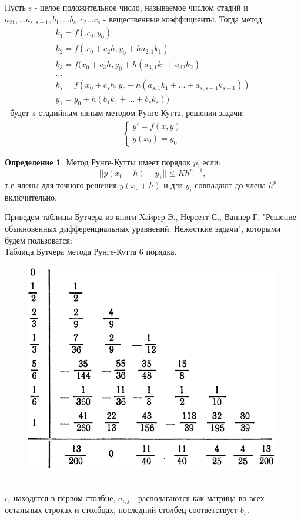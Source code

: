\documentclass[12pt, a4paper] {article}
\theoremstyle{remark}
\theoremstyle{definition}
\newtheorem{defin}{Определение}
\begin{document}
Пусть s - целое положительное число, называемое числом стадий и $a_{21}, \dots a_{s,s-1}, b_{1}, \dots b_{s}, c_{2} \dots c_{s}$ - вещественные коэффициенты. Тогда метод
\begin{gather}
k_1 = f (x_0, y_0) \nonumber\\
k_2 = f (x_0 + c_2h, y_0 + h a_{2,1} k_1) \nonumber \\
k_3 = f (x_0 + c_3h, y_0 + h (a_{3,1} k_1 + a_{32} k_2) \nonumber\\
\dots \nonumber\\
k_s = f (x_0 + c_s h, y_0 + h(a_{s,1} k_1 + \dots + a_{s,s-1}k_{s-1} ))\nonumber \\
y_1 = y_0 + h (b_1k_1 + \dots + b_s k_s))
\end{gather} - будет $s$-стадийным явным методом Рунге-Кутта, решения задачи:
\begin{gather}
\begin{cases}
y' = f(x, y) \\
y(x_0) = y_0
\end{cases}
\end{gather}
\begin{defin}
Метод Рунге-Кутты имеет порядок $p$, если:
 $$ || y(x_0 + h) - y_1 || \le Kh^{p+1},$$
 т.е члены для точного решения $y(x_0 + h)$ и для $y_i$ совпадают до члена $h^p$ включительно.
\end{defin}
Приведем таблицы Бутчера из книги Хайрер Э., Нерсетт С., Ваннер Г. "Решение обыкновенных дифференциальных уравнений. Нежесткие задачи", которыми будем пользоватся: \\
Таблица Бутчера метода Рунге-Кутта 6 порядка.\\
\begin{figure}[h!]
\centering
\includegraphics[width=0.5\linewidth]{butcher6.png} 
\end{figure}
\\
$c_i$ находятся в первом столбце, $a_{i,j}$ - располагаются как матрица во всех остальных строках и столбцах, последний столбец соответствует  $b_s.$
\end{document}
